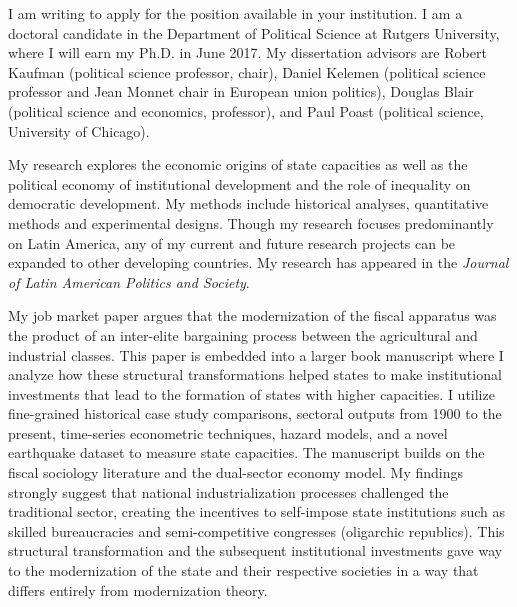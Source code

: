 \documentclass[10pt,stdletter,dateno,sigleft]{newlfm} %
\begin{document}
\begin{newlfm}


I am writing to apply for the position available in your institution. I am a doctoral candidate in the Department of Political Science at Rutgers University, where I will earn my Ph.D. in June 2017. My dissertation advisors are Robert Kaufman (political science professor, chair), Daniel Kelemen (political science professor and Jean Monnet chair in European union politics), Douglas Blair (political science and economics, professor), and Paul Poast (political science, University of Chicago).

My research explores the economic origins of state capacities as well as the political economy of institutional development and the role of inequality on democratic development. My methods include historical analyses, quantitative methods and experimental designs. Though my research focuses predominantly on Latin America, any of my current and future research projects can be expanded to other developing countries. My research has appeared in the \emph{Journal of Latin American Politics and Society}.

My job market paper argues that the modernization of the fiscal apparatus was the product of an inter-elite bargaining process between the agricultural and industrial classes. This paper is embedded into a larger book manuscript where I analyze how these structural transformations helped states to make institutional investments that lead to the formation of states with higher capacities. I utilize fine-grained historical case study comparisons, sectoral outputs from 1900 to the present, time-series econometric techniques, hazard models, and a novel earthquake dataset to measure state capacities. The manuscript builds on the fiscal sociology literature and the dual-sector economy model. My findings strongly suggest that national industrialization processes challenged the traditional sector, creating the incentives to self-impose state institutions such as skilled bureaucracies and semi-competitive congresses (oligarchic republics). This structural transformation and the subsequent institutional investments gave way to the modernization of the state and their respective societies in a way that differs entirely from modernization theory.



\end{newlfm}
\end{document}
